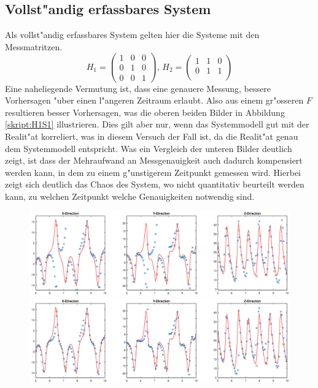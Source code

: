 \begin{refsection}
\subsection{Vollst"andig erfassbares System}
Als vollst"andig erfassbares System gelten hier die Systeme mit den Messmatritzen.
\[H_{1}=\begin{pmatrix}
1 & 0 & 0 \\ 
0 & 1 & 0 \\ 
0 & 0 & 1
\end{pmatrix} 
\text{, }
H_{2}=\begin{pmatrix}
1 & 1 & 0 \\ 
0 & 1 & 1 \\ 
\end{pmatrix}\]
Eine naheliegende Vermutung ist, dass eine genauere Messung, bessere Vorhersagen "uber einen l"angeren Zeitraum erlaubt. Also aus einem gr"osseren $F$ resultieren besser Vorhersagen, was die oberen beiden Bilder in Abbildung \ref{skript:H1S1} illustrieren. Dies gilt aber nur, wenn das Systemmodell gut mit der Realit"at korreliert, was in diesem Versuch der Fall ist, da die Realit"at genau dem Systemmodell entspricht.
Was ein Vergleich der unteren Bilder deutlich zeigt, ist dass der Mehraufwand an Messgenauigkeit auch dadurch kompensiert werden kann, in dem zu einem g"unstigerem Zeitpunkt gemessen wird. Hierbei zeigt sich deutlich das Chaos des System, wo nicht quantitativ beurteilt werden kann, zu welchen Zeitpunkt welche Genauigkeiten notwendig sind.
\begin{figure}
\centering
\includegraphics[width=\hsize]{kalman/figures/H1R10S1.eps}
\includegraphics[width=\hsize]{kalman/figures/H1R20S1.eps}

\end{figure}
\end{refsection}
